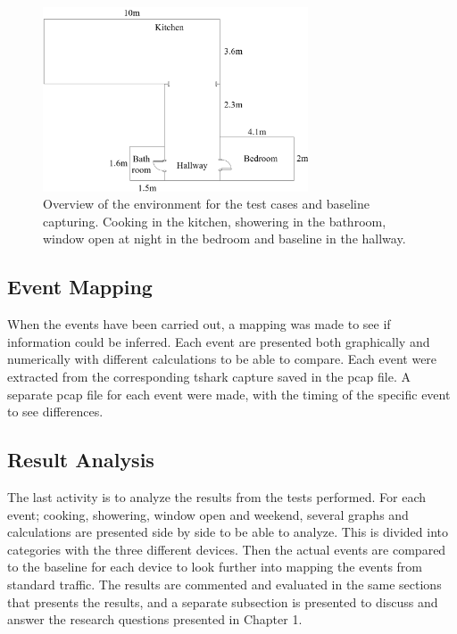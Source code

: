 \begin{figure}[H]
    \centering
    \includegraphics[width=0.7\textwidth]{figures/Apartment.png}
    \caption{Overview of the environment for the test cases and baseline capturing. Cooking in the kitchen, showering in the bathroom, window open at night in the bedroom and baseline in the hallway.}
    \label{fig:Apartment}
\end{figure}

\subsection{Event Mapping}
When the events have been carried out, a mapping was made to see if information could be inferred. Each event are presented both graphically and numerically with different calculations to be able to compare. Each event were extracted from the corresponding tshark capture saved in the pcap file. A separate pcap file for each event were made, with the timing of the specific event to see differences. 

\subsection{Result Analysis}
The last activity is to analyze the results from the tests performed. For each event; cooking, showering, window open and weekend, several graphs and calculations are presented side by side to be able to analyze. This is divided into categories with the three different devices. Then the actual events are compared to the baseline for each device to look further into mapping the events from standard traffic. The results are commented and evaluated in the same sections that presents the results, and a separate subsection is presented to discuss and answer the research questions presented in Chapter 1. 
